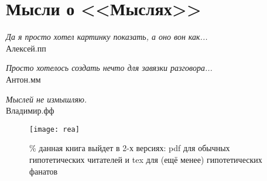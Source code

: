 \pagecolor{white}
\section*{Мысли о <<Мыслях>>}

\begin{flushright}
\emph{Да я просто хотел картинку показать, а оно вон как...}\\
    Алексей.пп %
\end{flushright}
\vspace{1cm}
\begin{flushright}
\emph{Просто хотелось создать нечто для завязки разговора...}\\
Антон.мм %
\end{flushright}
\vspace{1cm}
\begin{flushright}
\emph{Мыслей не измышляю.}\\
Владимир.фф %
\end{flushright}
\vspace{1.5cm}
\begin{figure}[ht!]
    \centering
    \texttt{[image: rea]}
    \caption{\% данная книга выйдет в 2-х версиях: pdf для обычных гипотетических читателей и tex для (ещё менее) гипотетических фанатов}
\end{figure}

